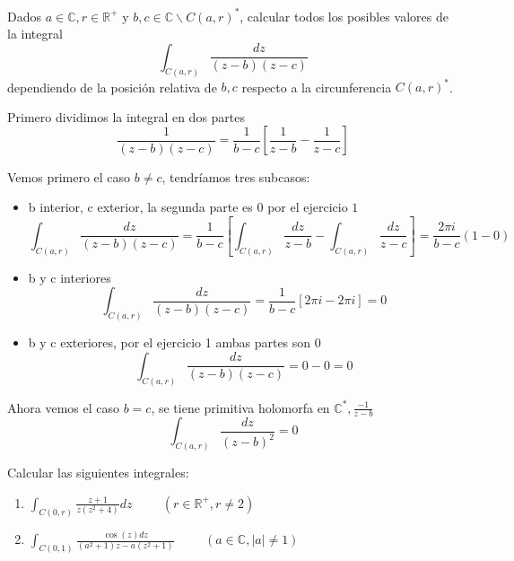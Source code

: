 \begin{ejer}
	Dados $a\in\mathbb{C}, r\in\mathbb{R}^+$ y $b,c\in\mathbb{C}\backslash C(a,r)^{\ast}$, calcular todos los posibles valores de la integral
	$$ \int_{C(a,r)} \frac{dz}{(z-b)(z-c)} $$
	dependiendo de la posición relativa de $b,c$ respecto a la circunferencia $C(a,r)^{\ast}$.
\end{ejer}

\begin{sol}
	Primero dividimos la integral en dos partes
$$\frac{1}{(z-b)(z-c)} = \frac{1}{b-c} \left[\frac{1}{z-b}-\frac{1}{z-c}\right]$$

Vemos primero el caso $b\not = c$, tendríamos tres subcasos:
\begin{itemize}
	\item b interior, c exterior, la segunda parte es $0$ por el ejercicio $1$
	$$\int_{C(a,r)} \frac{dz}{(z-b)(z-c)} = \frac{1}{b-c} \left[ \int_{C(a,r)} \frac{dz}{z-b} - \int_{C(a,r)} \frac{dz}{z-c} \right] = \frac{2\pi i}{b-c} (1 - 0)$$
	
	\item b y c interiores 
	$$\int_{C(a,r)} \frac{dz}{(z-b)(z-c)} =  \frac{1}{b-c}[2\pi i - 2\pi i] = 0$$
	
	\item b y c exteriores, por el ejercicio 1 ambas partes son $0$
	$$\int_{C(a,r)} \frac{dz}{(z-b)(z-c)} = 0-0 = 0$$
\end{itemize}

Ahora vemos el caso $b=c$, se tiene primitiva holomorfa en $\mathbb{C}^{\ast}, \frac{-1}{z-b}$
$$ \int_{C(a,r)} \frac{dz}{(z-b)^2} = 0 $$

\end{sol}


\begin{ejer}
	Calcular las siguientes integrales:
	\begin{enumerate}[label=(\alph*)]
		\item $\int_{C(0,r)} \frac{z+1}{z(z^2+4)}dz \hspace{1cm} (r\in\mathbb{R}^+, r\not =2)$
		\item $\int_{C(0,1)} \frac{\cos(z)dz}{(a^2+1)z-a(z^2+1)} \hspace{1cm} (a\in\mathbb{C}, |a|\not =1)$
	\end{enumerate}
\end{ejer}

